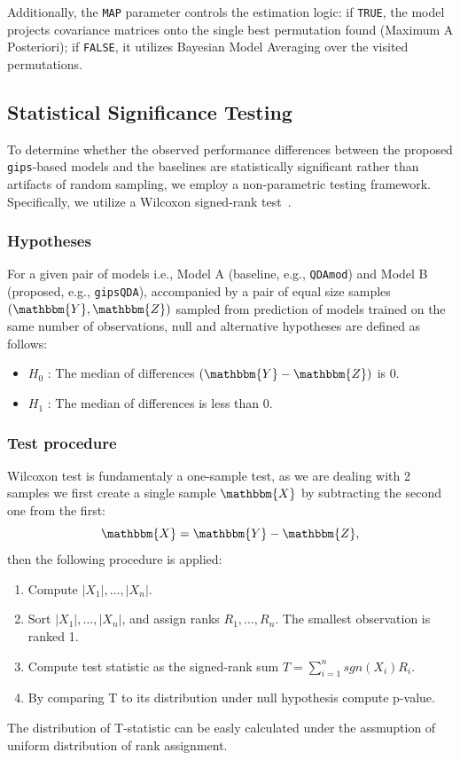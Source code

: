 \documentclass[a4paper,11pt,twoside]{report}
\theoremstyle{definition}
\begin{document}
Additionally, the \texttt{MAP} parameter controls the estimation logic: if \texttt{TRUE}, the model projects covariance matrices onto the single best permutation found (Maximum A Posteriori); if \texttt{FALSE}, it utilizes Bayesian Model Averaging over the visited permutations.

\subsection{Statistical Significance Testing}
\label{sec:statistical_testing}

To determine whether the observed performance differences between the proposed \texttt{gips}-based models and the baselines are statistically significant rather than artifacts of random sampling, we employ a non-parametric testing framework. Specifically, we utilize a Wilcoxon signed-rank test~\cite{hollander2013nonparametric}.
\subsubsection{Hypotheses}
For a given pair of models i.e., Model A (baseline, e.g., \texttt{QDAmod}) and Model B (proposed, e.g., \texttt{gipsQDA}), accompanied by a pair of equal size samples $(\mathbbm{Y}, \mathbbm{Z})$ sampled from prediction of models trained on the same number of observations, null and alternative hypotheses are defined as follows:
\begin{itemize}
    \item $H_0$ : The median of differences $(\mathbbm{Y} - \mathbbm{Z})$ is 0.
    \item $H_1$ : The median of differences is less than 0.
\end{itemize}
\subsubsection{Test procedure}
Wilcoxon test is fundamentaly a one-sample test, as we are dealing with 2 samples we first create a single sample $\mathbbm{X}$ by subtracting the second one from the first:
\begin{equation}
    \mathbbm{X} = \mathbbm{Y} - \mathbbm{Z},
\end{equation}
then the following procedure is applied:
\begin{enumerate}
    \item Compute $|X_1|, \dots, |X_n|$.
    \item Sort $|X_1|, \dots, |X_n|$, and assign ranks $R_1, \dots, R_n$. The smallest observation is ranked 1.
    \item Compute test statistic as the signed-rank sum $T = \sum_{i=1}^{n} sgn(X_i)R_i$.
    \item By comparing T to its distribution under null hypothesis compute p-value.
\end{enumerate}
The distribution of T-statistic can be easly calculated under the assmuption of uniform distribution of rank assignment.
\end{document}
